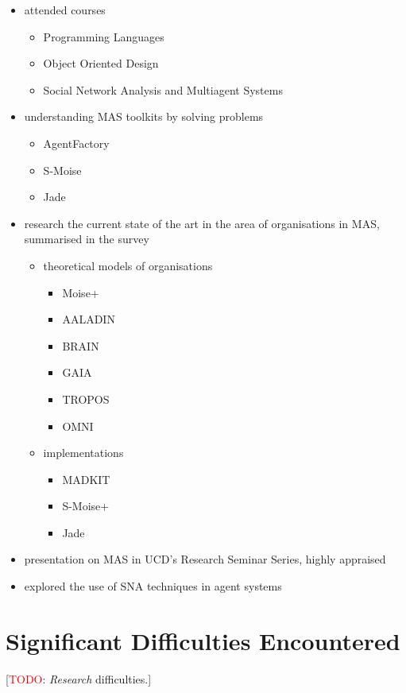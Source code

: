 \documentclass{article}
\newcommand{\todo}[1]{[\textcolor{red}{TODO}: #1]}
\begin{document}
\begin{itemize}
\item attended courses
  \begin{itemize}
  \item Programming Languages
  \item Object Oriented Design
  \item Social Network Analysis and Multiagent Systems
  \end{itemize}
\item understanding MAS toolkits by solving problems
  \begin{itemize}
  \item AgentFactory
  \item S-Moise
  \item Jade
  \end{itemize}
\item 
  research the current state of the art in the area of organisations in MAS,
  summarised in the survey
  \begin{itemize}
  \item theoretical models of organisations
    \begin{itemize}
    \item Moise+
    \item AALADIN
    \item BRAIN
    \item GAIA
    \item TROPOS
    \item OMNI
    \end{itemize}
  \item implementations
    \begin{itemize}
    \item MADKIT
    \item S-Moise+
    \item Jade
    \end{itemize}
  \end{itemize}
\item presentation on MAS in UCD's Research Seminar Series, highly appraised
\item explored the use of SNA techniques in agent systems
\end{itemize}


\section{Significant Difficulties Encountered}

\todo{\emph{Research} difficulties.}
\end{document}
